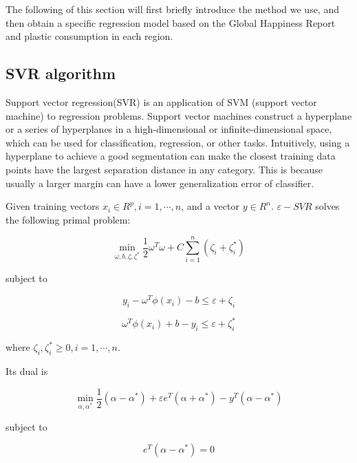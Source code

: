 \documentclass{mcmthesis}
\begin{document}
The following of this section will first briefly introduce the method we use, and then obtain a specific regression model based on the Global Happiness Report\cite{World} and plastic consumption in each region\cite{Plastic}.

\subsection{SVR algorithm}

Support vector regression(SVR) is an application of SVM (support vector machine) to regression problems. Support vector machines construct a hyperplane or a series of hyperplanes in a high-dimensional or infinite-dimensional space, which can be used for classification, regression, or other tasks. Intuitively, using a hyperplane to achieve a good segmentation can make the closest training data points have the largest separation distance in any category. This is because usually a larger margin can have a lower generalization error of classifier\cite{SVRs}.

Given training vectors $x_i \in R^p, i = 1, \cdots, n$, and a vector $y \in R^n$. $\varepsilon-SVR$ solves the following primal problem:

\begin{equation}
\min_{\omega,b,\zeta,\zeta^*}\frac{1}{2}\omega^T\omega + C \sum_{i = 1}^n(\zeta_i + \zeta_i^*) 
\label{primal}
\end{equation}

subject to 

\begin{equation}
y_i - \omega^T\phi(x_i) - b \le\varepsilon + \zeta_i
\label{sub1}
\end{equation}

\begin{equation}
\omega^T\phi(x_i) + b - y_i \le\varepsilon + \zeta_i^*
\label{sub2}
\end{equation}

where $\zeta_i, \zeta_i^* \ge 0, i = 1, \cdots, n$.

Its dual is

\begin{equation}
\min_{\alpha,\alpha^*}\frac{1}{2}(\alpha-\alpha^*) + \varepsilon e^T(\alpha + \alpha^*) - y^T(\alpha-\alpha^*)
\label{dual}
\end{equation}

subject to 

\begin{equation}
e^T(\alpha - \alpha^*) = 0
\label{sub4}
\end{equation}
\end{document}
